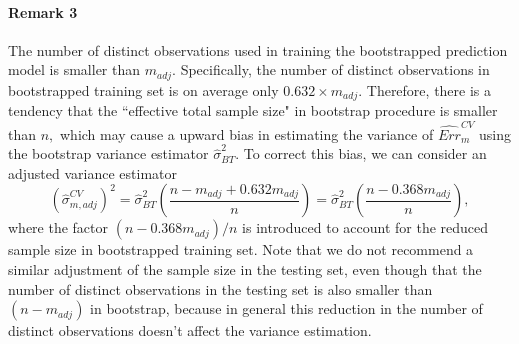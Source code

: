 \documentclass[12pt]{article}
\begin{document}
\paragraph{Remark 3} 
The number of distinct observations used in training the bootstrapped prediction model is smaller than $m_{adj}$. Specifically, the number of distinct observations in bootstrapped training set is on average only $0.632\times m_{adj}.$ Therefore, there is a tendency that the ``effective total sample size" in bootstrap procedure is smaller than $n,$ which may cause a upward bias in estimating the variance of $\widehat{Err}_m^{CV}$ using the bootstrap variance estimator $\hat{\sigma}_{BT}^2.$ To correct this bias, we can consider an adjusted variance estimator
$$ \left(\hat{\sigma}_{m,adj}^{CV}\right)^2=\hat{\sigma}_{BT}^2\left( \frac{n-m_{adj}+0.632m_{adj}}{n}\right)=\hat{\sigma}_{BT}^2\left(\frac{n-0.368m_{adj}}{n}\right),$$
where the factor $(n-0.368m_{adj})/n$ is introduced to account for the reduced sample size in bootstrapped training set. Note that we do not recommend a similar adjustment of the sample size in the testing set, even though that the number of distinct observations in the testing set is also smaller than $(n-m_{adj})$ in bootstrap, because in general this reduction in the number of distinct observations doesn't affect the variance estimation. 
\end{document}
